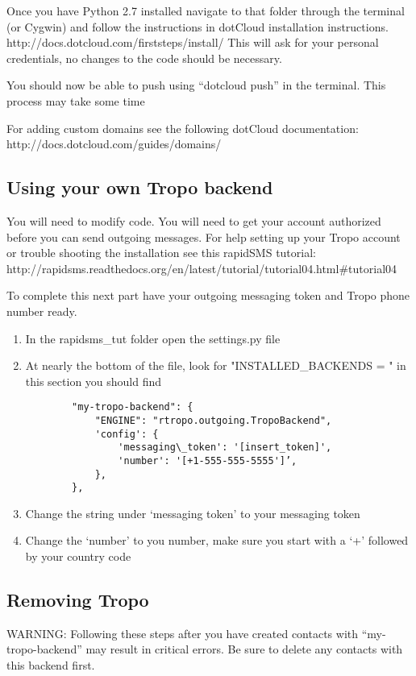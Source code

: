 Once you have Python 2.7 installed navigate to that folder through the terminal (or Cygwin) and follow the instructions in dotCloud installation instructions. http://docs.dotcloud.com/firststeps/install/
This will ask for your personal credentials, no changes to the code should be necessary.

You should now be able to push using “dotcloud push” in the terminal. This process may take some time

For adding custom domains see the following dotCloud documentation: http://docs.dotcloud.com/guides/domains/

\subsection*{Using your own Tropo backend}
You will need to modify code. You will need to get your account authorized before you can send outgoing messages. For help setting up your Tropo account  or trouble shooting the installation see this rapidSMS tutorial: http://rapidsms.readthedocs.org/en/latest/tutorial/tutorial04.html\#tutorial04

To complete this next part have your outgoing messaging token and Tropo phone number ready. 

\begin{enumerate}
	\item In the rapidsms\_tut folder open the settings.py file
	\item At nearly the bottom of the file, look for "INSTALLED\_BACKENDS = " in this section you should find 
	\begin{verbatim}
	    "my-tropo-backend": {
	        "ENGINE": "rtropo.outgoing.TropoBackend",
	        'config': {
	            'messaging\_token': '[insert_token]',
	            'number': '[+1-555-555-5555']’,
	        },
	    },
	\end{verbatim}
	\item Change the string under ‘messaging token’ to your messaging token
	\item Change the ‘number’ to you number, make sure you start with a ‘+’ followed by your country code
\end{enumerate}

\subsection*{Removing Tropo}
WARNING: Following these steps after you have created contacts with “my-tropo-backend” may result in critical errors. Be sure to delete any contacts with this backend first.

